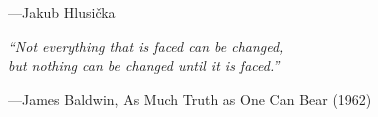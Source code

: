 \begin{flushright}
---Jakub Hlusička
\end{flushright}

\vfill
\begin{center}
{\large
    \textit{``Not everything that is faced can be changed,\hspace{40pt}\\
    \hspace{40pt} but nothing can be changed until it is faced.''}
}
\end{center}
\begin{flushright}
    ---James Baldwin, As Much Truth as One Can Bear (1962)
\end{flushright}
